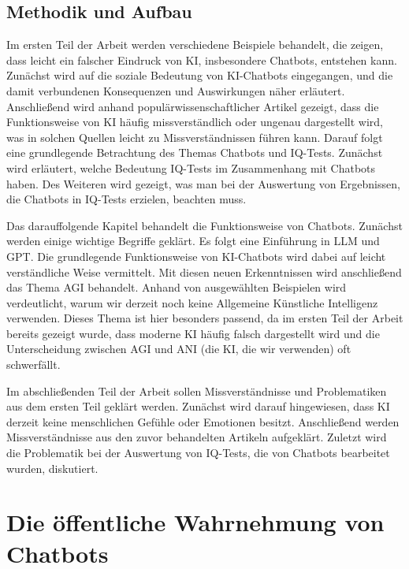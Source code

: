 	\subsection{Methodik und Aufbau} 
	Im ersten Teil der Arbeit werden verschiedene Beispiele behandelt, die zeigen, dass leicht ein falscher 
	Eindruck von KI, insbesondere Chatbots, entstehen kann. Zunächst wird auf die soziale Bedeutung von
	KI-Chatbots eingegangen, und die damit verbundenen Konsequenzen und Auswirkungen näher erläutert. Anschließend
	wird anhand populärwissenschaftlicher Artikel gezeigt, dass die Funktionsweise von KI häufig missverständlich 
	oder ungenau dargestellt wird, was in solchen Quellen leicht zu Missverständnissen führen kann.
	Darauf folgt eine grundlegende Betrachtung des Themas Chatbots und IQ-Tests. Zunächst wird erläutert, welche
	Bedeutung IQ-Tests im Zusammenhang mit Chatbots haben. Des Weiteren wird gezeigt, was man bei der Auswertung von 
	Ergebnissen, die Chatbots in IQ-Tests erzielen, beachten muss.

	Das darauffolgende Kapitel behandelt die Funktionsweise von Chatbots. Zunächst werden einige wichtige Begriffe geklärt. 
	Es folgt eine Einführung in LLM und GPT. Die grundlegende Funktionsweise von KI-Chatbots wird dabei auf leicht  
	verständliche Weise vermittelt. Mit diesen neuen Erkenntnissen wird anschließend das Thema AGI behandelt. Anhand von ausgewählten
	Beispielen wird verdeutlicht, warum wir derzeit noch keine Allgemeine Künstliche Intelligenz verwenden. Dieses Thema ist hier
	besonders passend, da im ersten Teil der Arbeit bereits gezeigt wurde, dass moderne KI häufig falsch dargestellt wird und die 
	Unterscheidung zwischen AGI und ANI (die KI, die wir verwenden) oft schwerfällt.

	Im abschließenden Teil der Arbeit sollen Missverständnisse und Problematiken aus dem ersten Teil geklärt werden. Zunächst wird 
	darauf hingewiesen, dass KI derzeit keine menschlichen Gefühle oder Emotionen besitzt. Anschließend werden Missverständnisse aus
	den zuvor behandelten Artikeln aufgeklärt. Zuletzt wird die Problematik bei der Auswertung von IQ-Tests,
	die von Chatbots bearbeitet wurden, diskutiert. 	
	
	
\clearpage
\section{Die öffentliche Wahrnehmung von Chatbots}\label{s1}
